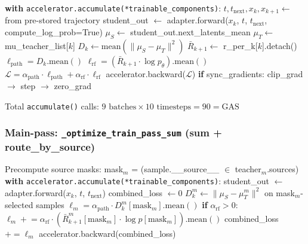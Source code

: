 \documentclass[11pt]{article}
\begin{document}
\begin{algorithm}[H]
\caption{OPD Main-pass (standard)}
\begin{algorithmic}
    \STATE \textbf{with} \texttt{accelerator.accumulate(*trainable\_components)}:
    \STATE \quad $t, t_\text{next}, x_k, x_{k+1} \leftarrow$ from pre-stored trajectory
    \STATE \quad student\_out $\leftarrow$ adapter.forward($x_k$, $t$, $t_\text{next}$, compute\_log\_prob=True)
    \STATE \quad $\mu_S \leftarrow$ student\_out.next\_latents\_mean 
    \STATE \quad $\mu_T \leftarrow$ mu\_teacher\_list[$k$] 
    \STATE \quad $D_k \leftarrow \text{mean}(\|\mu_S - \mu_T\|^2)$
    \STATE \quad $\bar{R}_{k+1} \leftarrow$ r\_per\_k[$k$].detach()
    \STATE \quad $\ell_\text{path} = D_k.\text{mean}()$
    \STATE \quad $\ell_\text{rf} = (\bar{R}_{k+1} \cdot \log p_\theta).\text{mean}()$
    \STATE \quad $\mathcal{L} = \alpha_\text{path} \cdot \ell_\text{path} + \alpha_\text{rf} \cdot \ell_\text{rf}$ 
    \STATE \quad accelerator.backward($\mathcal{L}$) 
    \STATE \quad \textbf{if} sync\_gradients: clip\_grad $\to$ step $\to$ zero\_grad
\ENDFOR
\end{algorithmic}
\end{algorithm}

Total \texttt{accumulate()} calls: $9 \text{ batches} \times 10 \text{ timesteps} = 90 = \text{GAS}$ \checkmark

\subsubsection{Main-pass: \texttt{\_optimize\_train\_pass\_sum} (sum + route\_by\_source)}

\begin{algorithm}[H]
\caption{OPD Main-pass (sum mode)}
\begin{algorithmic}
\STATE Precompute source masks: mask$_m$ = (sample.\_\_source\_\_ $\in$ teacher$_m$.sources)
    \STATE \textbf{with} \texttt{accelerator.accumulate(*trainable\_components)}:
    \STATE \quad student\_out $\leftarrow$ adapter.forward($x_k$, $t$, $t_\text{next}$)
    \STATE \quad combined\_loss $\leftarrow 0$
        \STATE \quad $D_k^m \leftarrow \|\mu_S - \mu_T^m\|^2$ on mask$_m$-selected samples
        \STATE \quad $\ell_m = \alpha_\text{path} \cdot D_k^m[\text{mask}_m].\text{mean}()$
        \STATE \quad \textbf{if} $\alpha_\text{rf} > 0$: $\ell_m \mathrel{+}= \alpha_\text{rf} \cdot (\bar{R}^m_{k+1}[\text{mask}_m] \cdot \log p[\text{mask}_m]).\text{mean}()$
        \STATE \quad combined\_loss $\mathrel{+}= \ell_m$
    \ENDFOR
    \STATE \quad accelerator.backward(combined\_loss)
\ENDFOR
\end{algorithmic}
\end{algorithm}
\end{document}
